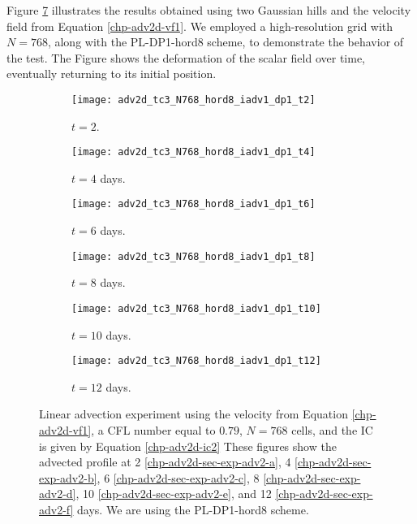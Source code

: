 Figure \ref{chp-adv2d-sec-exp-adv2} illustrates the results obtained using two Gaussian hills and the velocity field 
from Equation \eqref{chp-adv2d-vf1}.
We employed a high-resolution grid with $N=768$, along with the PL-DP1-hord8 scheme,
to demonstrate the behavior of the test.
The Figure shows the deformation of the scalar field over time, eventually returning to its initial position.

\begin{figure}[!htb]
	\centering
	\begin{subfigure}{0.25\textwidth}
		\centering
		\texttt{[image: adv2d\_tc3\_N768\_hord8\_iadv1\_dp1\_t2]}
		\caption{$t=2$.\label{chp-adv2d-sec-exp-adv2-a}}
	\end{subfigure}
	\begin{subfigure}{0.25\textwidth}
		\centering
		\texttt{[image: adv2d\_tc3\_N768\_hord8\_iadv1\_dp1\_t4]}
		\caption{$t=4$ days.\label{chp-adv2d-sec-exp-adv2-b}}
	\end{subfigure}
	\begin{subfigure}{0.25\textwidth}
		\centering
		\texttt{[image: adv2d\_tc3\_N768\_hord8\_iadv1\_dp1\_t6]}
		\caption{$t=6$ days.\label{chp-adv2d-sec-exp-adv2-c}}
	\end{subfigure}
	
	\begin{subfigure}{0.25\textwidth}
		\centering
		\texttt{[image: adv2d\_tc3\_N768\_hord8\_iadv1\_dp1\_t8]}
		\caption{$t=8$ days.\label{chp-adv2d-sec-exp-adv2-d}}
	\end{subfigure}
	\begin{subfigure}{0.25\textwidth}
		\centering
		\texttt{[image: adv2d\_tc3\_N768\_hord8\_iadv1\_dp1\_t10]}
		\caption{$t=10$ days.\label{chp-adv2d-sec-exp-adv2-e}}
	\end{subfigure}
	\begin{subfigure}{0.25\textwidth}
		\centering
		\texttt{[image: adv2d\_tc3\_N768\_hord8\_iadv1\_dp1\_t12]}
		\caption{$t=12$ days.\label{chp-adv2d-sec-exp-adv2-f}}
	\end{subfigure}
	\caption{Linear advection experiment using the velocity from Equation \eqref{chp-adv2d-vf1},
		a CFL number equal to $0.79$, $N=768$ cells, and the IC is given by 
		Equation \eqref{chp-adv2d-ic2}
		These figures show the advected profile at
		2 \eqref{chp-adv2d-sec-exp-adv2-a}, 
		4  \eqref{chp-adv2d-sec-exp-adv2-b},
		6  \eqref{chp-adv2d-sec-exp-adv2-c},
		8  \eqref{chp-adv2d-sec-exp-adv2-d},
		10  \eqref{chp-adv2d-sec-exp-adv2-e},
		and 12  \eqref{chp-adv2d-sec-exp-adv2-f} days.
		We are using the PL-DP1-hord8 scheme. \label{chp-adv2d-sec-exp-adv2}}
\end{figure}


